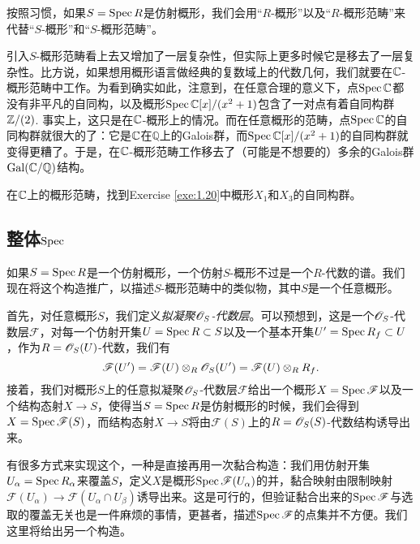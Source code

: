 按照习惯，如果$S=\operatorname{Spec} R$是仿射概形，我们会用“$R$-概形”以及“$R$-概形范畴”来代替“$S$-概形”和“$S$-概形范畴”。

引入$S$-概形范畴看上去又增加了一层复杂性，但实际上更多时候它是移去了一层复杂性。比方说，如果想用概形语言做经典的复数域上的代数几何，我们就要在$\mathbb{C}$-概形范畴中工作。为看到确实如此，注意到，在任意合理的意义下，点$\operatorname{Spec} \mathbb{C}$都没有非平凡的自同构，以及概形$\operatorname{Spec} \mathbb{C}[x]/(x^2+1)$包含了一对点有着自同构群$\mathbb{Z}/(2)$. 事实上，这只是在$\mathbb{C}$-概形上的情况。而在任意概形的范畴，点$\operatorname{Spec} \mathbb{C}$的自同构群就很大的了：它是$\mathbb{C}$在$\mathbb Q$上的Galois群，而$\operatorname{Spec} \mathbb{C}[x]/(x^2+1)$的自同构群就变得更糟了。于是，在$\mathbb{C}$-概形范畴工作移去了（可能是不想要的）多余的Galois群$\mathrm{Gal}(\mathbb{C}/\mathbb Q)$结构。

\begin{exe}\label{exe:1.50}
在$\mathbb{C}$上的概形范畴，找到Exercise \ref{exe:1.20}中概形$X_1$和$X_3$的自同构群。
\end{exe}

\subsection{整体\texorpdfstring{$\operatorname{Spec}$}{Spec}} \label{s:1.3.3}

如果$S=\operatorname{Spec} R$是一个仿射概形，一个仿射$S$-概形不过是一个$R$-代数的谱。我们现在将这个构造推广，以描述$S$-概形范畴中的类似物，其中$S$是一个任意概形。

首先，对任意概形$S$，我们定义\textit{拟凝聚$\mathscr{O}_S$-代数层}。可以预想到，这是一个$\mathscr{O}_S$-代数层$\mathscr F$，对每一个仿射开集$U=\operatorname{Spec} R\subset S$以及一个基本开集$U'=\operatorname{Spec} R_f\subset U$，作为$R=\mathscr{O}_S(U)$-代数，我们有
\[
	\mathscr F(U')=\mathscr F(U)\otimes_R \mathscr{O}_S(U')=\mathscr F(U)\otimes_R R_f.
\]
接着，我们对概形$S$上的任意拟凝聚$\mathscr{O}_S$-代数层$\mathscr F$给出一个概形$X=\operatorname{Spec} \mathscr F$以及一个结构态射$X\to S$，使得当$S=\operatorname{Spec} R$是仿射概形的时候，我们会得到$X=\operatorname{Spec} \mathscr F(S)$，而结构态射$X\to S$将由$\mathscr F(S)$上的$R=\mathscr{O}_S(S)$-代数结构诱导出来。

有很多方式来实现这个，一种是直接再用一次黏合构造：我们用仿射开集$U_\alpha=\operatorname{Spec} R_\alpha$来覆盖$S$，定义$X$是概形$\operatorname{Spec} \mathscr F(U_\alpha)$的并，黏合映射由限制映射$\mathscr F(U_\alpha)\to \mathscr F(U_\alpha\cap U_\beta)$诱导出来。这是可行的，但验证黏合出来的$\operatorname{Spec} \mathscr F$与选取的覆盖无关也是一件麻烦的事情，更甚者，描述$\operatorname{Spec} \mathscr F$的点集并不方便。我们这里将给出另一个构造。

